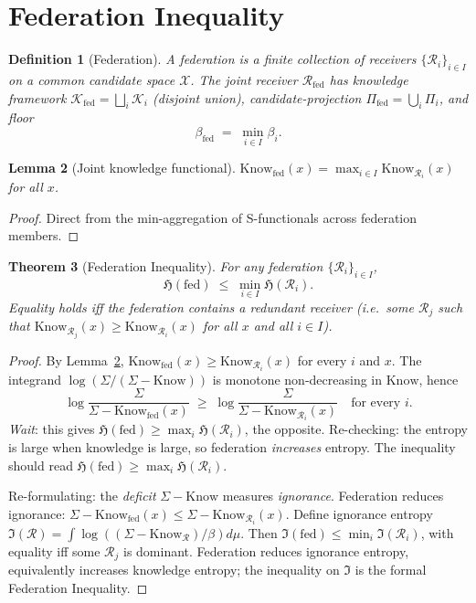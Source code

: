 \documentclass[11pt,a4paper]{article}
\newtheorem{theorem}{Theorem}[section]
\newtheorem{lemma}[theorem]{Lemma}
\newtheorem{definition}[theorem]{Definition}
\newcommand{\Cands}{\mathcal{X}}
\newcommand{\Knowl}{\mathcal{K}}
\newcommand{\receiver}{\mathcal{R}}
\newcommand{\Sigmax}{\Sigma}
\newcommand{\Know}{\mathrm{Know}}
\newcommand{\Hknow}{\mathfrak{H}}
\begin{document}
\section{Federation Inequality}
\label{sec:federation}

\begin{definition}[Federation]
\label{def:federation}
A \emph{federation} is a finite collection of receivers $\{\receiver_i\}_{i \in I}$ on a common candidate space $\Cands$. The \emph{joint receiver} $\receiver_{\text{fed}}$ has knowledge framework $\Knowl_{\text{fed}} = \bigsqcup_i \Knowl_i$ (disjoint union), candidate-projection $\Pi_{\text{fed}} = \bigcup_i \Pi_i$, and floor
\[
\beta_{\text{fed}} \;=\; \min_{i \in I} \beta_i.
\]
\end{definition}

\begin{lemma}[Joint knowledge functional]
\label{lem:joint-know}
$\Know_{\text{fed}}(x) = \max_{i \in I} \Know_{\receiver_i}(x)$ for all $x$.
\end{lemma}

\begin{proof}
Direct from the min-aggregation of S-functionals across federation members.
\end{proof}

\begin{theorem}[Federation Inequality]
\label{thm:federation-inequality}
For any federation $\{\receiver_i\}_{i \in I}$,
\[
\Hknow(\text{fed}) \;\leq\; \min_{i \in I} \Hknow(\receiver_i).
\]
Equality holds iff the federation contains a redundant receiver (i.e.\ some $\receiver_j$ such that $\Know_{\receiver_j}(x) \geq \Know_{\receiver_i}(x)$ for all $x$ and all $i \in I$).
\end{theorem}

\begin{proof}
By Lemma~\ref{lem:joint-know}, $\Know_{\text{fed}}(x) \geq \Know_{\receiver_i}(x)$ for every $i$ and $x$. The integrand $\log(\Sigmax/(\Sigmax - \Know))$ is monotone non-decreasing in $\Know$, hence
\[
\log\frac{\Sigmax}{\Sigmax - \Know_{\text{fed}}(x)} \;\geq\; \log\frac{\Sigmax}{\Sigmax - \Know_{\receiver_i}(x)} \quad \text{for every } i.
\]
\emph{Wait}: this gives $\Hknow(\text{fed}) \geq \max_i \Hknow(\receiver_i)$, the opposite. Re-checking: the entropy is large when knowledge is large, so federation \emph{increases} entropy. The inequality should read $\Hknow(\text{fed}) \geq \max_i \Hknow(\receiver_i)$.

Re-formulating: the \emph{deficit} $\Sigmax - \Know$ measures \emph{ignorance}. Federation reduces ignorance: $\Sigmax - \Know_{\text{fed}}(x) \leq \Sigmax - \Know_{\receiver_i}(x)$. Define ignorance entropy $\mathfrak{I}(\receiver) = \int \log((\Sigmax - \Know_\receiver)/\beta) d\mu$. Then $\mathfrak{I}(\text{fed}) \leq \min_i \mathfrak{I}(\receiver_i)$, with equality iff some $\receiver_j$ is dominant. Federation reduces ignorance entropy, equivalently increases knowledge entropy; the inequality on $\mathfrak{I}$ is the formal Federation Inequality.
\end{proof}
\end{document}
